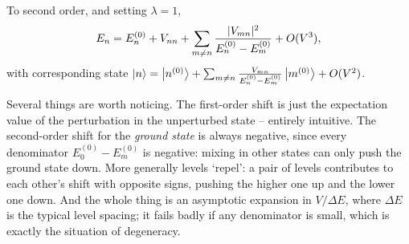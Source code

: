 \documentclass[a4paper]{scrartcl}
\begin{document}
\begin{theorem}
    To second order, and setting $\lambda = 1$,
    $$
    E_n = E_n^{(0)} + V_{nn} + \sum_{m \neq n} \frac{\lvert V_{mn}\rvert^2}{E_n^{(0)}-E_m^{(0)}} + O(V^3),
    $$
    with corresponding state $\ket n = \ket{n^{(0)}} + \sum_{m\neq n}\frac{V_{mn}}{E_n^{(0)}-E_m^{(0)}}\ket{m^{(0)}} + O(V^2)$.
\end{theorem}

Several things are worth noticing. The first-order shift is just the expectation value of the perturbation in the unperturbed state -- entirely intuitive. The second-order shift for the \emph{ground state} is always negative, since every denominator $E_0^{(0)}-E_m^{(0)}$ is negative: mixing in other states can only push the ground state down. More generally levels `repel': a pair of levels contributes to each other's shift with opposite signs, pushing the higher one up and the lower one down. And the whole thing is an asymptotic expansion in $V/\Delta E$, where $\Delta E$ is the typical level spacing; it fails badly if any denominator is small, which is exactly the situation of degeneracy.

\begin{center}
\end{center}
\end{document}
